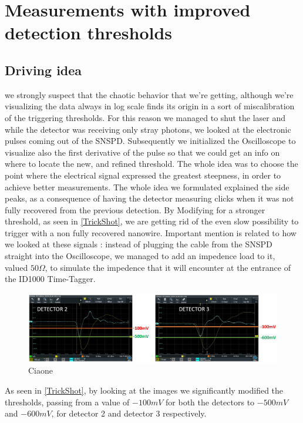 \section{Measurements with improved detection thresholds}
\subsection{Driving idea}
we strongly suspect that the chaotic behavior that we're getting, although we're visualizing the data always in log scale finds its origin in a sort of miscalibration of the triggering thresholds.
For this reason we managed to shut the laser and while the detector was receiving only stray photons, we looked at the electronic pulses coming out of the SNSPD.
Subsequently we initialized the Oscilloscope to visualize also the first derivative of the pulse so that we could get an info on where to locate the new, and refined threshold. The whole idea was to choose the point where the electrical signal expressed the greatest steepness, in order to achieve better measurements.
The whole idea we formulated explained the side peaks, as a consequence of having the detector measuring clicks when it was not fully recovered from the previous detection. By Modifying for a stronger threshold, as seen in \autoref{TrickShot}, we are getting rid of the even slow possibility to trigger with a non fully recovered nanowire.
Important mention is related to how we looked at these signals : instead of plugging the cable from the SNSPD straight into the Oscilloscope, we managed to add an impedence load to it, valued $50 \Omega$, to simulate the impedence that it will encounter at the entrance of the ID1000 Time-Tagger.

\begin{figure}[hbtp]
\centering
\includegraphics[width=1\textwidth]{ScopeShots.jpg}
\caption{Ciaone}
\label{TrickShot}
\end{figure}

As seen in \autoref{TrickShot}, by looking at the images we significantly modified the thresholds, passing from a value of $-100mV$ for both the detectors to $-500mV$ and $-600mV$, for detector 2 and detector 3 respectively.


